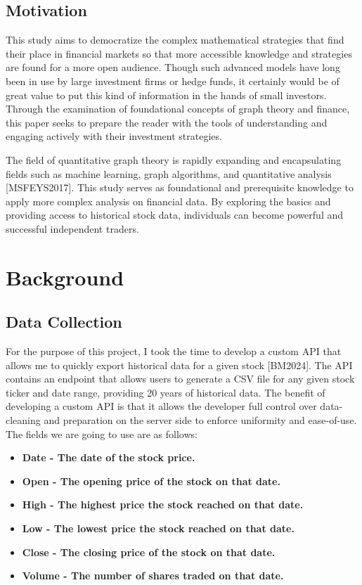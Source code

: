 \documentclass{article}
\begin{document}
\subsection{Motivation}

This study aims to democratize the complex mathematical strategies that find their place in financial markets so that more accessible knowledge and strategies are found for a more open audience. Though such advanced models have long been in use by large investment firms or hedge funds, it certainly would be of great value to put this kind of information in the hands of small investors. Through the examination of foundational concepts of graph theory and finance, this paper seeks to prepare the reader with the tools of understanding and engaging actively with their investment strategies.

The field of quantitative graph theory is rapidly expanding and encapsulating fields such as machine learning, graph algorithms, and quantitative analysis [MSFEYS2017]. This study serves as foundational and prerequisite knowledge to apply more complex analysis on financial data. By exploring the basics and providing  access to historical stock data, individuals can become powerful and successful independent traders.


\section{Background}

\subsection{Data Collection}

For the purpose of this project, I took the time to develop a custom API that allows me to quickly export historical data for a given stock [BM2024]. The API contains an endpoint that allows users to generate a CSV file for any given stock ticker and date range, providing 20 years of historical data. The benefit of developing a custom API is that it allows the developer full control over data-cleaning and preparation on the server side to enforce uniformity and ease-of-use. The fields we are going to use are as follows:

\begin{itemize}
    \item \bf{Date} - The date of the stock price. 
    \item \bf{Open} - The opening price of the stock on that date.
    \item \bf{High} - The highest price the stock reached on that date.
    \item \bf{Low} - The lowest price the stock reached on that date.
    \item \bf{Close} - The closing price of the stock on that date.
    \item \bf{Volume} - The number of shares traded on that date.
\end{itemize}
\end{document}
